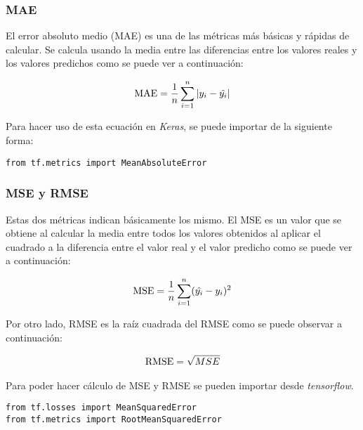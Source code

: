\subsubsection{MAE}

El error absoluto medio (MAE) es una de las métricas más básicas y rápidas de calcular. Se calcula usando la media entre las diferencias entre los valores reales y los valores predichos como se puede ver a continuación:

\begin{equation}
\centering
    \begin{split}
        \text{MAE} = \frac{1}{n} \sum_{i=1}^n |y_i - \hat{y_i}|
    \end{split}
\end{equation}

Para hacer uso de esta ecuación en \textit{Keras}, se puede importar de la siguiente forma:


\begin{verbatim}
from tf.metrics import MeanAbsoluteError
\end{verbatim}

\subsubsection{MSE y RMSE}

Estas dos métricas indican básicamente los mismo. El MSE es un valor que se obtiene al calcular la media entre todos los valores obtenidos al aplicar el cuadrado a la diferencia entre el valor real y el valor predicho como se puede ver a continuación:

\begin{equation}
\centering
    \begin{split}
        \text{MSE} = \frac{1}{n} \sum_{i=1}^n (\hat{y_i} - y_i)^2
    \end{split}
\end{equation}

Por otro lado, RMSE es la raíz cuadrada del RMSE como se puede observar a continuación:

\begin{equation}
\centering
    \begin{split}
        \text{RMSE} = \sqrt{MSE}
    \end{split}
\end{equation}

Para poder hacer cálculo de MSE y RMSE se pueden importar desde \textit{tensorflow}.

\begin{verbatim}
from tf.losses import MeanSquaredError
from tf.metrics import RootMeanSquaredError
\end{verbatim}

